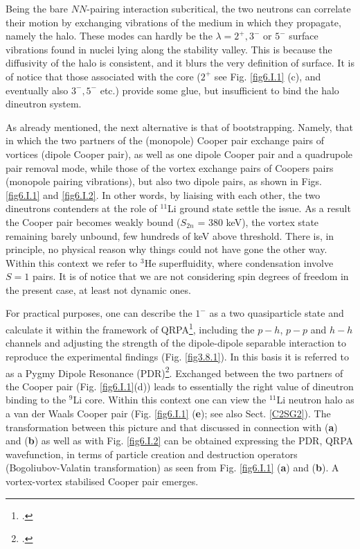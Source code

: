 \begin{subappendices}
Being the bare $NN$-pairing interaction subcritical, the two neutrons can correlate their motion by exchanging vibrations of the medium in which they propagate, namely  the halo.  These modes can hardly  be the $\lambda= 2^+,3^-$ or $5^-$ surface vibrations found in nuclei lying along the  stability valley. This is because the diffusivity of the halo is consistent, and it blurs the very definition of surface. It is of notice that those associated with  the core ($ 2^+$ see Fig. \ref{fig6.I.1} (c), and eventually also $3^-,5^-$ etc.) provide some glue, but insufficient to bind  the  halo dineutron system.

As already mentioned, the next alternative is that of bootstrapping. 
 Namely, that in which the two partners of the  (monopole) Cooper pair exchange  pairs of vortices 
(dipole Cooper pair),  as well as one dipole Cooper pair and a quadrupole pair removal mode,
while those of the vortex exchange  pairs of Coopers pairs (monopole pairing vibrations), but also two dipole pairs, as shown in Figs. \ref{fig6.I.1} and \ref{fig6.I.2}.  In other words, by  liaising  with each other,  
the two dineutrons contenders at the role of $^{11}$Li ground state  settle the issue.  As a result  the Cooper pair becomes weakly bound ($S_{2n}$ = 380 keV), the vortex state remaining barely unbound, few hundreds of keV above threshold.
There is, in principle, no physical reason why things could not have gone  the other way. Within this context we refer to $^3$He superfluidity, where condensation involve $S=1$ pairs. It is of notice that we are not considering spin degrees of freedom in  the present case,
at least  not dynamic ones. 

For practical purposes, one can describe the  $1^-$ as a two quasiparticle state and calculate it within  the framework of QRPA\footnote{\cite{Broglia:19}.},  including the $p-h$, $p-p$ and $h-h$ channels and adjusting the strength of the dipole-dipole separable interaction to reproduce the  experimental findings (Fig. \ref{fig3.8.1}). In this basis it is referred to  as a Pygmy Dipole  Resonance (PDR)\footnote{\cite{Barranco:01,Broglia:19c}.}. Exchanged between the  two partners of the Cooper pair (Fig. \ref{fig6.I.1}(d)) leads to essentially the right value of  dineutron binding  to the $^9$Li core. Within this context  one can view the
$^{11}$Li neutron halo as a van der Waals Cooper pair 
 (Fig. \ref{fig6.I.1} (\textbf{e}); see also Sect. \ref{C2SG2}). The transformation between this picture and  that discussed in connection with 
(\textbf{a}) and (\textbf{b}) as well as with Fig. \ref{fig6.I.2} can be obtained  expressing the PDR, QRPA wavefunction, in terms of particle  creation and destruction operators (Bogoliubov-Valatin transformation) as seen from Fig. \ref{fig6.I.1} (\textbf{a}) and (\textbf{b}). 
A vortex-vortex  stabilised Cooper pair emerges. 


\end{subappendices}
